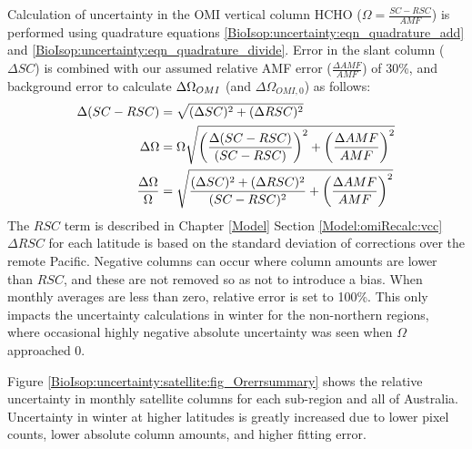     
    Calculation of uncertainty in the OMI vertical column HCHO ($\Omega  = \frac{SC - RSC}{AMF}$) is performed using quadrature equations \ref{BioIsop:uncertainty:eqn_quadrature_add} and \ref{BioIsop:uncertainty:eqn_quadrature_divide}.
    Error in the slant column ($\Delta SC$) is combined with our assumed relative AMF error ($\frac{\Delta AMF}{AMF}$) of 30\%, and background error to calculate $\Delta \Omega_{OMI}$ (and $\Delta \Omega_{OMI,0}$) as follows:
    \begin{align}
      \Delta (SC-RSC) & = \sqrt{(\Delta SC)^2 + (\Delta RSC)^2} \notag \\
      \Delta \Omega   & = \Omega \sqrt{ \left( \frac{\Delta (SC-RSC)}{(SC-RSC)} \right)^2 + \left( \frac{\Delta AMF}{AMF} \right)^2 } \notag \\
      \frac{\Delta \Omega}{\Omega} & = \sqrt{ \frac{ (\Delta SC)^2 + (\Delta RSC)^2}{(SC-RSC)^2} + \left( \frac{\Delta AMF}{AMF} \right)^2 } \label{BioIsop:uncertainty:satellite:eqn_VCC_uncertainty} 
    \end{align}
    The $RSC$ term is described in Chapter \ref{Model} Section \ref{Model:omiRecalc:vcc} $\Delta RSC$ for each latitude is based on the standard deviation of corrections over the remote Pacific.
    Negative columns can occur where column amounts are lower than $RSC$, and these are not removed so as not to introduce a bias.
    When monthly averages are less than zero, relative error is set to 100\%.
    This only impacts the uncertainty calculations in winter for the non-northern regions, where occasional highly negative absolute uncertainty was seen when $\Omega$ approached 0.
    
    
    Figure \ref{BioIsop:uncertainty:satellite:fig_Orerrsummary} shows the relative uncertainty in monthly satellite columns for each sub-region and all of Australia.
    Uncertainty in winter at higher latitudes is greatly increased due to lower pixel counts, lower absolute column amounts, and higher fitting error.
    
    
